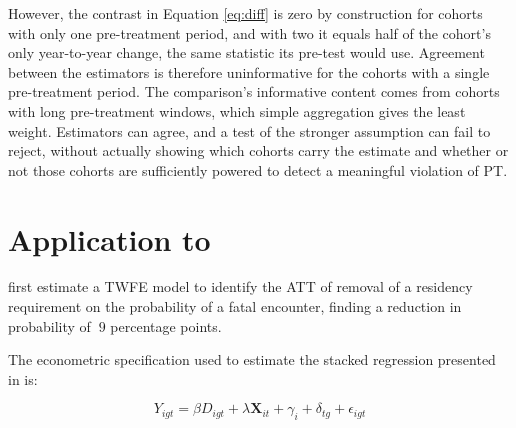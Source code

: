\documentclass[12pt]{article}
\begin{document}
However, the contrast in Equation \ref{eq:diff} is zero by construction for cohorts with only one pre-treatment period, and with two it equals half of the cohort's only year-to-year change, the same statistic its pre-test would use. Agreement between the estimators is therefore uninformative for the cohorts with a single pre-treatment period. The comparison's informative content comes from cohorts with long pre-treatment windows, which simple aggregation gives the least weight. Estimators can agree, and a test of the stronger assumption can fail to reject, without actually showing which cohorts carry the estimate and whether or not those cohorts are sufficiently powered to detect a meaningful violation of PT.


\section{Application to \textcite{payson2025residency}}\label{sec:application}


\textcite{payson2025residency} first estimate a TWFE model to identify the ATT of removal of a residency requirement on the probability of a fatal encounter, finding a reduction in probability of $~9$ percentage points. 

The econometric specification used to estimate the stacked regression presented in \textcite{payson2025residency} is:

\begin{equation}\label{eq:add_model}
    Y_{igt} = \beta D_{igt} + \lambda \mathbf{X}_{it} + \gamma_{i} + \delta_{tg} + \epsilon_{igt}
\end{equation}
\end{document}
